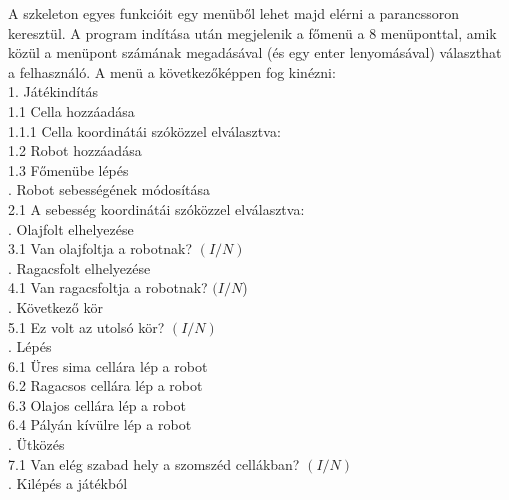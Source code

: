 A szkeleton egyes funkcióit egy menüből lehet majd elérni a parancssoron keresztül. A program indítása után megjelenik a főmenü a 8 menüponttal, amik közül a menüpont számának megadásával (és egy enter lenyomásával) választhat a felhasználó. A menü a következőképpen fog kinézni:\\

1. Játékindítás\\
\indent \hspace{1 cm}1.1 Cella hozzáadása\\
\indent \hspace{2 cm} 1.1.1 Cella koordinátái szóközzel elválasztva:\\
\indent \hspace{1 cm} 1.2 Robot hozzáadása\\
\indent \hspace{1 cm} 1.3 Főmenübe lépés\\
. Robot sebességének módosítása\\
\indent \hspace{1 cm} 2.1 A sebesség koordinátái szóközzel elválasztva:\\
. Olajfolt elhelyezése\\
\indent \hspace{1 cm} 3.1 Van olajfoltja a robotnak? $(I/N)$\\
. Ragacsfolt elhelyezése\\
\indent \hspace{1 cm} 4.1 Van ragacsfoltja a robotnak? $(I/N$)\\
. Következő kör\\
\indent \hspace{1 cm} 5.1 Ez volt az utolsó kör? $(I/N)$\\
. Lépés\\
\indent \hspace{1 cm} 6.1 Üres sima cellára lép a robot\\
\indent \hspace{1 cm} 6.2 Ragacsos cellára lép a robot\\
\indent \hspace{1 cm} 6.3 Olajos cellára lép a robot\\
\indent \hspace{1 cm} 6.4 Pályán kívülre lép a robot\\
. Ütközés\\
\indent \hspace{1 cm}	7.1 Van elég szabad hely a szomszéd cellákban? $(I/N)$\\	
. Kilépés a játékból\\

